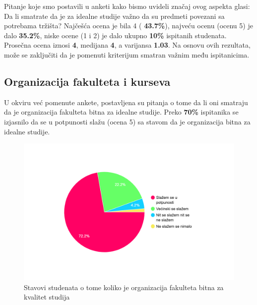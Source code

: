\documentclass[a4paper]{article}
\begin{document}
{ Pitanje koje smo postavili u anketi kako bismo uvideli značaj ovog aspekta glasi: Da li smatrate da je za idealne studije važno da su predmeti povezani sa potrebama tržišta? Najčešća ocena je bila 4 ( \textbf{43.7\%}), najveću ocenu (ocenu 5) je dalo \textbf{35.2\%}, niske ocene (1 i 2) je dalo ukupno \textbf{10\%} ispitanih studenata. Prosečna ocena iznosi \textbf{4}, medijana \textbf{4}, a varijansa \textbf{1.03}. Na osnovu ovih rezultata, može se zaključiti da je pomenuti kriterijum smatran važnim među ispitanicima.


\subsection{Organizacija fakulteta i kurseva}
\label{subsec:organizacija_stavovi}

U okviru već pomenute ankete, postavljena su pitanja o tome da li oni smatraju da je organizacija fakulteta bitna za idealne studije. Preko \textbf{70\%} ispitanika se izjasnilo da se u potpunosti slažu (ocena 5) sa stavom da je organizacija bitna za idealne studije.
\begin{figure}[h!]
\begin{center}
    \includegraphics[width=0.7\linewidth]{Slike/PieChartOrganizacijaFakulteta.png}
    \caption{Stavovi studenata o tome koliko je organizacija fakulteta bitna za kvalitet studija}
    \label{fig:organizacija}
\end{center}
\end{figure}

}
\end{document}
